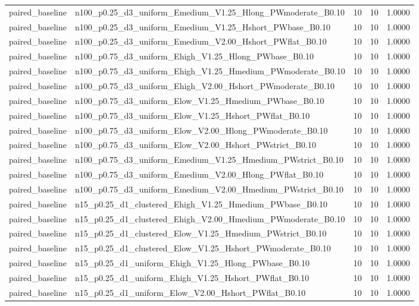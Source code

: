 \begin{tabular}{llrrr}
paired_baseline & n100_p0.25_d3_uniform_Emedium_V1.25_Hlong_PWmoderate_B0.10 & 10 & 10 & 1.0000 \\
paired_baseline & n100_p0.25_d3_uniform_Emedium_V1.25_Hshort_PWbase_B0.10 & 10 & 10 & 1.0000 \\
paired_baseline & n100_p0.25_d3_uniform_Emedium_V2.00_Hshort_PWflat_B0.10 & 10 & 10 & 1.0000 \\
paired_baseline & n100_p0.75_d3_uniform_Ehigh_V1.25_Hlong_PWbase_B0.10 & 10 & 10 & 1.0000 \\
paired_baseline & n100_p0.75_d3_uniform_Ehigh_V1.25_Hmedium_PWmoderate_B0.10 & 10 & 10 & 1.0000 \\
paired_baseline & n100_p0.75_d3_uniform_Ehigh_V2.00_Hshort_PWmoderate_B0.10 & 10 & 10 & 1.0000 \\
paired_baseline & n100_p0.75_d3_uniform_Elow_V1.25_Hmedium_PWbase_B0.10 & 10 & 10 & 1.0000 \\
paired_baseline & n100_p0.75_d3_uniform_Elow_V1.25_Hshort_PWflat_B0.10 & 10 & 10 & 1.0000 \\
paired_baseline & n100_p0.75_d3_uniform_Elow_V2.00_Hlong_PWmoderate_B0.10 & 10 & 10 & 1.0000 \\
paired_baseline & n100_p0.75_d3_uniform_Elow_V2.00_Hshort_PWstrict_B0.10 & 10 & 10 & 1.0000 \\
paired_baseline & n100_p0.75_d3_uniform_Emedium_V1.25_Hmedium_PWstrict_B0.10 & 10 & 10 & 1.0000 \\
paired_baseline & n100_p0.75_d3_uniform_Emedium_V2.00_Hlong_PWflat_B0.10 & 10 & 10 & 1.0000 \\
paired_baseline & n100_p0.75_d3_uniform_Emedium_V2.00_Hmedium_PWstrict_B0.10 & 10 & 10 & 1.0000 \\
paired_baseline & n15_p0.25_d1_clustered_Ehigh_V1.25_Hmedium_PWbase_B0.10 & 10 & 10 & 1.0000 \\
paired_baseline & n15_p0.25_d1_clustered_Ehigh_V2.00_Hmedium_PWmoderate_B0.10 & 10 & 10 & 1.0000 \\
paired_baseline & n15_p0.25_d1_clustered_Elow_V1.25_Hmedium_PWstrict_B0.10 & 10 & 10 & 1.0000 \\
paired_baseline & n15_p0.25_d1_clustered_Elow_V1.25_Hshort_PWmoderate_B0.10 & 10 & 10 & 1.0000 \\
paired_baseline & n15_p0.25_d1_uniform_Ehigh_V1.25_Hlong_PWbase_B0.10 & 10 & 10 & 1.0000 \\
paired_baseline & n15_p0.25_d1_uniform_Ehigh_V1.25_Hshort_PWflat_B0.10 & 10 & 10 & 1.0000 \\
paired_baseline & n15_p0.25_d1_uniform_Elow_V2.00_Hshort_PWflat_B0.10 & 10 & 10 & 1.0000 \\

\end{tabular}
